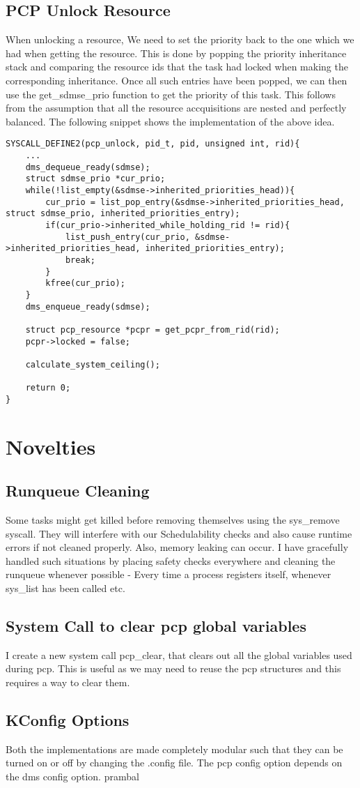 \documentclass[12pt, letterpaper]{article}
\begin{document}
\subsection{PCP Unlock Resource}
When unlocking a resource, We need to set the priority back to the one which we had when getting the resource. This is done by popping the priority inheritance stack and comparing the resource ids that the 
task had locked when making the corresponding inheritance. Once all such entries have been popped, we can then use the {\ttfamily get\_sdmse\_prio} function to get the priority of this task. This follows 
from the assumption that all the resource accquisitions are nested and perfectly balanced. The following snippet shows the implementation of the above idea.
\begin{lstlisting}
SYSCALL_DEFINE2(pcp_unlock, pid_t, pid, unsigned int, rid){
    ...
    dms_dequeue_ready(sdmse);
    struct sdmse_prio *cur_prio;
    while(!list_empty(&sdmse->inherited_priorities_head)){
        cur_prio = list_pop_entry(&sdmse->inherited_priorities_head, struct sdmse_prio, inherited_priorities_entry);
        if(cur_prio->inherited_while_holding_rid != rid){
            list_push_entry(cur_prio, &sdmse->inherited_priorities_head, inherited_priorities_entry);
            break;
        }
        kfree(cur_prio);
    }
    dms_enqueue_ready(sdmse);

    struct pcp_resource *pcpr = get_pcpr_from_rid(rid);
    pcpr->locked = false;

    calculate_system_ceiling();

    return 0;
}
\end{lstlisting}
\section{Novelties}
\subsection{Runqueue Cleaning}
Some tasks might get killed before removing themselves using the {\ttfamily sys\_remove} syscall. They will interfere with our Schedulability checks and also cause runtime errors if not cleaned properly. 
Also, memory leaking can occur. I have gracefully handled such situations by placing safety checks everywhere and cleaning the runqueue whenever possible - Every time a process registers itself, whenever 
{\ttfamily sys\_list} has been called etc.
\subsection{System Call to clear pcp global variables}
I create a new system call pcp\_clear, that clears out all the global variables used during pcp. This is useful as we may need to reuse the pcp structures and this requires a way to clear them.
\subsection{KConfig Options}
Both the implementations are made completely modular such that they can be turned on or off by changing the .config file. The pcp config option depends on the dms config option.
prambal
\end{document}
